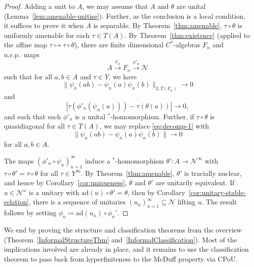\documentclass[a4paper,11pt]{amsart}
\theoremstyle{definition}
\numberwithin{equation}{section}
\numberwithin{theorem}{section}
\begin{document}
\begin{proof}
	Adding a unit to $A$, we may assume that $A$ and $\theta$ are unital (Lemma~\ref{lem:amenable-unitise}).  Further, as the conclusion is a local condition, it suffices to prove it when $A$ is separable.  By Theorem~\ref{thm:amenable}, $\tau \circ \theta$ is uniformly amenable for each $\tau \in T(A)$.  By Theorem~\ref{thm:existence} (applied to the affine map $\tau \mapsto \tau \circ \theta$), there are finite dimensional $C^*$-algebras $F_n$ and u.c.p.\ maps
	\begin{equation}
		A \overset{\psi_n}{\longrightarrow} F_n \overset{\phi'_n}{\longrightarrow} \mathcal N
	\end{equation}
	such that for all $a, b \in A$ and $\tau \in Y$, we have
	\begin{equation}
		\|\psi_n(ab) - \psi_n(a)\psi_n(b)\|_{2, T(F_n)} \rightarrow 0\label{eq:decomp-1}
	\end{equation}
	and
	\begin{equation}
		| \tau(\phi'_n(\psi_n(a))) - \tau(\theta(a))| \rightarrow 0,
	\end{equation}
	and such that each $\phi'_n$ is a unital $^*$-homomorphism.  Further, if $\tau \circ \theta$ is quasidiagonal for all $\tau \in T(A)$, we may replace \eqref{eq:decomp-1} with
	\begin{equation}
		\|\psi_n(ab) - \psi_n(a)\psi_n(b)\| \rightarrow 0
	\end{equation}
	for all $a, b \in A$.
	
	The maps $(\phi'_n \circ \psi_n)_{n=1}^\infty$ induce a $^*$-homomorphism $\theta' \colon A \rightarrow \mathcal N^\infty$ with $\tau \circ \theta' = \tau \circ \theta$ for all $\tau \in Y^\infty$.  By Theorem~\ref{thm:amenable}, $\theta'$ is tracially nuclear, and hence by Corollary~\ref{cor:uniqueness}, $\theta$ and $\theta'$ are unitarily equivalent.  If $u \in \mathcal N^\omega$ is a unitary with $\mathrm{ad}(u) \circ \theta' = \theta$, then by Corollary~\ref{cor:unitary-stable-relation}, there is a sequence of unitaries $(u_n)_{n=1}^\infty \subseteq \mathcal N$ lifting $u$.  The result follows by setting $\phi_n \coloneqq \mathrm{ad}(u_n) \circ \phi_n'$.
\end{proof}

We end by proving the structure and classification theorems from the overview (Theorem~\ref{InformalStructureThm} and~\ref{InformalClassification}).  Most of the implications involved are already in place, and it remains to  use the classification theorem to pass back from hyperfiniteness to the McDuff property via CPoU.
\end{document}
